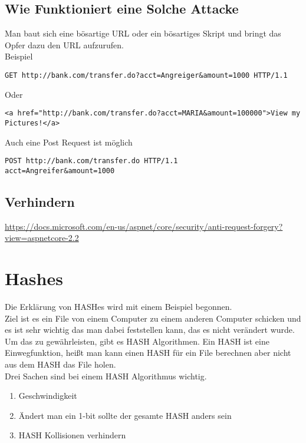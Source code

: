 {\subsection{Wie Funktioniert eine Solche Attacke}
\label{sec:xsrf_how}
Man baut sich eine bösartige URL oder ein bösartiges Skript und bringt das Opfer dazu den URL aufzurufen. 
\\
Beispiel
\begin{lstlisting}
GET http://bank.com/transfer.do?acct=Angreiger&amount=1000 HTTP/1.1
\end{lstlisting}
Oder
\begin{lstlisting}
<a href="http://bank.com/transfer.do?acct=MARIA&amount=100000">View my Pictures!</a>
\end{lstlisting}
Auch eine Post Request ist möglich
\\
\begin{lstlisting}
POST http://bank.com/transfer.do HTTP/1.1
acct=Angreifer&amount=1000
\end{lstlisting}
\textcite{CSRF}
\subsection{Verhindern}
\label{sec:xsrf_prevent}
\url{https://docs.microsoft.com/en-us/aspnet/core/security/anti-request-forgery?view=aspnetcore-2.2}
\section{Hashes}
\label{hash-expl}
Die Erklärung von HASHes wird mit einem Beispiel begonnen.
\\Ziel ist es ein File von einem Computer zu einem anderen Computer schicken und es ist sehr wichtig das man dabei feststellen kann, das es nicht verändert wurde. Um das zu gewährleisten, gibt es HASH Algorithmen. Ein HASH ist eine Einwegfunktion, heißt man kann einen HASH für ein File berechnen aber nicht aus dem HASH das File holen.\\
Drei Sachen sind bei einem HASH Algorithmus wichtig.
\begin{enumerate}
\item Geschwindigkeit
\item Ändert man ein 1-bit sollte der gesamte HASH anders sein
\item HASH Kollisionen verhindern 
\end{enumerate}
}
